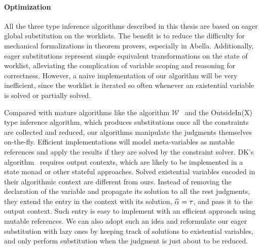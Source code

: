 
\paragraph{Optimization}

All the three type inference algorithms described
in this thesis are based on eager global substitution on the worklists.
The benefit is to reduce the difficulty for mechanical formalizations
in theorem provers, especially in Abella.
Additionally, eager substitutions represent simple equivalent transformations
on the state of worklist,
alleviating the complication of variable scoping and reasoning for correctness.
However, a naive implementation of our algorithm will be very inefficient,
since the worklist is iterated so often
whenever an existential variable is solved or partially solved.

Compared with mature algorithms like the algorithm $\mathcal{W}$~\citep{milner1978theory}
and the OutsideIn(X)~\citep{outsidein} type inference algorithm,
which produces substitutions once all the constraints are collected and reduced,
our algorithms manipulate the judgments themselves on-the-fly.
Efficient implementations will model meta-variables as mutable references
and apply the results if they are solved by the constraint solver.
DK's algorithm~\citep{dunfield2013complete} requires output contexts,
which are likely to be implemented in a state monad or other stateful approaches.
Solved existential variables encoded in their algorithmic context are different from ours.
Instead of removing the declaration of the variable and propagate its solution to
all the rest judgments, they extend the entry in the context with its solution,
$\al = \tau$, and pass it to the output context.
Such entry is easy to implement with an efficient approach using mutable references.
We can also adopt such an idea and reformulate our eager substitution with
lazy ones by keeping track of solutions to existential variables,
and only perform substitution when the judgment is just about to be reduced.

